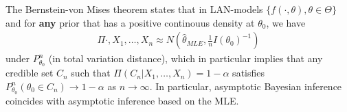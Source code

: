 \begin{thm}
  \label{defn:bayesian_inference:1}
  The Bernstein-von Mises theorem states that in LAN-models $\{
  f(\cdot, \theta), \theta \in \Theta \}$ and for \textbf{any} prior
  that has a positive continouus density at $\theta_{0}$, we have
  \begin{align}
    \label{eq:100}
    \Pi{\cdot, X_{1}, \dots, X_{n}} \approx N(\hat \theta_{MLE}, \frac{1}{n}I(\theta_{0})^{-1})
  \end{align} under $P_{\theta_{0}}^{n}$ (in total variation
  distance), which in particular implies that any credible set $C_{n}$
  such that $\Pi(C_{n} | X_{1}, \dots, X_{n}) = 1 - \alpha$ satisfies
  $P_{\theta_{0}}^{n}(\theta_{0} \in C_{n}) \rightarrow 1 - \alpha$ as
  $n \rightarrow \infty$.  In particular, asymptotic Bayesian inference
  coincides with asymptotic inference based on the MLE.
\end{thm}



